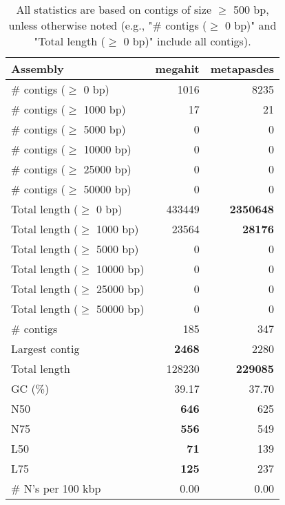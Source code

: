 \documentclass[12pt,a4paper]{article}
\begin{document}
\begin{table}[ht]
\begin{center}
\caption{All statistics are based on contigs of size $\geq$ 500 bp, unless otherwise noted (e.g., "\# contigs ($\geq$ 0 bp)" and "Total length ($\geq$ 0 bp)" include all contigs).}
\begin{tabular}{|l*{2}{|r}|}
\hline
Assembly & megahit & metapasdes \\ \hline
\# contigs ($\geq$ 0 bp) & 1016 & 8235 \\ \hline
\# contigs ($\geq$ 1000 bp) & 17 & 21 \\ \hline
\# contigs ($\geq$ 5000 bp) & 0 & 0 \\ \hline
\# contigs ($\geq$ 10000 bp) & 0 & 0 \\ \hline
\# contigs ($\geq$ 25000 bp) & 0 & 0 \\ \hline
\# contigs ($\geq$ 50000 bp) & 0 & 0 \\ \hline
Total length ($\geq$ 0 bp) & 433449 & {\bf 2350648} \\ \hline
Total length ($\geq$ 1000 bp) & 23564 & {\bf 28176} \\ \hline
Total length ($\geq$ 5000 bp) & 0 & 0 \\ \hline
Total length ($\geq$ 10000 bp) & 0 & 0 \\ \hline
Total length ($\geq$ 25000 bp) & 0 & 0 \\ \hline
Total length ($\geq$ 50000 bp) & 0 & 0 \\ \hline
\# contigs & 185 & 347 \\ \hline
Largest contig & {\bf 2468} & 2280 \\ \hline
Total length & 128230 & {\bf 229085} \\ \hline
GC (\%) & 39.17 & 37.70 \\ \hline
N50 & {\bf 646} & 625 \\ \hline
N75 & {\bf 556} & 549 \\ \hline
L50 & {\bf 71} & 139 \\ \hline
L75 & {\bf 125} & 237 \\ \hline
\# N's per 100 kbp & 0.00 & 0.00 \\ \hline
\end{tabular}
\end{center}
\end{table}
\end{document}
